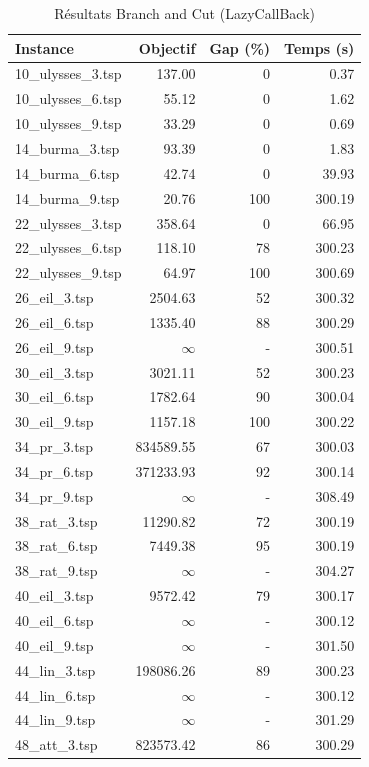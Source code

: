 \begin{table}[H]
\centering
\caption{Résultats Branch and Cut (LazyCallBack)}
\small
\begin{tabular}{|l|r|r|r|}
\hline
\textbf{Instance} & \textbf{Objectif} & \textbf{Gap (\%)} & \textbf{Temps (s)} \\
\hline
10\_ulysses\_3.tsp & 137.00 & 0 & 0.37 \\
10\_ulysses\_6.tsp & 55.12 & 0 & 1.62 \\
10\_ulysses\_9.tsp & 33.29 & 0 & 0.69 \\
14\_burma\_3.tsp & 93.39 & 0 & 1.83 \\
14\_burma\_6.tsp & 42.74 & 0 & 39.93 \\
14\_burma\_9.tsp & 20.76 & 100 & 300.19 \\
22\_ulysses\_3.tsp & 358.64 & 0 & 66.95 \\
22\_ulysses\_6.tsp & 118.10 & 78 & 300.23 \\
22\_ulysses\_9.tsp & 64.97 & 100 & 300.69 \\
26\_eil\_3.tsp & 2504.63 & 52 & 300.32 \\
26\_eil\_6.tsp & 1335.40 & 88 & 300.29 \\
26\_eil\_9.tsp & $\infty$ & - & 300.51 \\
30\_eil\_3.tsp & 3021.11 & 52 & 300.23 \\
30\_eil\_6.tsp & 1782.64 & 90 & 300.04 \\
30\_eil\_9.tsp & 1157.18 & 100 & 300.22 \\
34\_pr\_3.tsp & 834589.55 & 67 & 300.03 \\
34\_pr\_6.tsp & 371233.93 & 92 & 300.14 \\
34\_pr\_9.tsp & $\infty$ & - & 308.49 \\
38\_rat\_3.tsp & 11290.82 & 72 & 300.19 \\
38\_rat\_6.tsp & 7449.38 & 95 & 300.19 \\
38\_rat\_9.tsp & $\infty$ & - & 304.27 \\
40\_eil\_3.tsp & 9572.42 & 79 & 300.17 \\
40\_eil\_6.tsp & $\infty$ & - & 300.12 \\
40\_eil\_9.tsp & $\infty$ & - & 301.50 \\
44\_lin\_3.tsp & 198086.26 & 89 & 300.23 \\
44\_lin\_6.tsp & $\infty$ & - & 300.12 \\
44\_lin\_9.tsp & $\infty$ & - & 301.29 \\
48\_att\_3.tsp & 823573.42 & 86 & 300.29 \\

\end{tabular}
\end{table}
